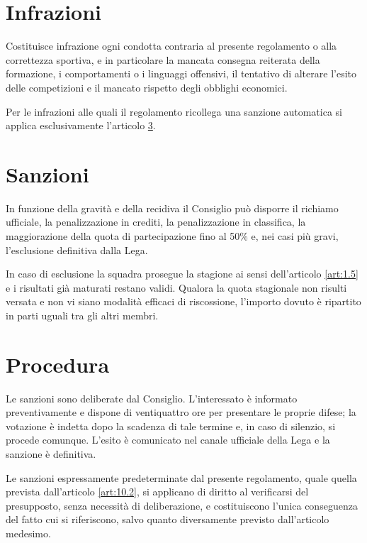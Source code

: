 \section{Infrazioni}
\label{art:3.2}

Costituisce infrazione ogni condotta contraria al presente regolamento o alla correttezza sportiva, e in particolare la mancata consegna reiterata della formazione, i comportamenti o i linguaggi offensivi, il tentativo di alterare l'esito delle competizioni e il mancato rispetto degli obblighi economici.

Per le infrazioni alle quali il regolamento ricollega una sanzione automatica si applica esclusivamente l'articolo \ref{art:3.4}.

\section{Sanzioni}
\label{art:3.3}

In funzione della gravità e della recidiva il Consiglio può disporre il richiamo ufficiale, la penalizzazione in crediti, la penalizzazione in classifica, la maggiorazione della quota di partecipazione fino al 50\% e, nei casi più gravi, l'esclusione definitiva dalla Lega.

In caso di esclusione la squadra prosegue la stagione ai sensi dell'articolo \ref{art:1.5} e i risultati già maturati restano validi. Qualora la quota stagionale non risulti versata e non vi siano modalità efficaci di riscossione, l'importo dovuto è ripartito in parti uguali tra gli altri membri.

\section{Procedura}
\label{art:3.4}

Le sanzioni sono deliberate dal Consiglio. L'interessato è informato preventivamente e dispone di ventiquattro ore per presentare le proprie difese; la votazione è indetta dopo la scadenza di tale termine e, in caso di silenzio, si procede comunque. L'esito è comunicato nel canale ufficiale della Lega e la sanzione è definitiva.

Le sanzioni espressamente predeterminate dal presente regolamento, quale quella prevista dall'articolo \ref{art:10.2}, si applicano di diritto al verificarsi del presupposto, senza necessità di deliberazione, e costituiscono l'unica conseguenza del fatto cui si riferiscono, salvo quanto diversamente previsto dall'articolo medesimo.


